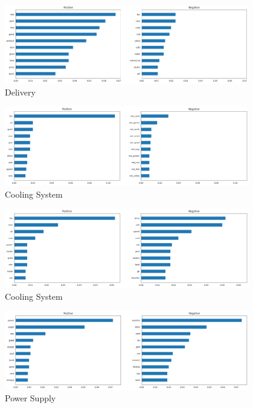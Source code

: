 \begin{figure}[p]
  \centering
  \includegraphics[width=0.95\textwidth]{images/experiments/T2-Delivery.png}
  \caption{Delivery}
  \label{fig:T2-Delivery}
\end{figure}

\begin{figure}[p]
  \centering
  \includegraphics[width=0.95\textwidth]{images/experiments/T3-CoolingSystem.png}
  \caption{Cooling System}
  \label{fig:T3-CoolingSystem}
\end{figure}

\begin{figure}[p]
  \centering
  \includegraphics[width=0.95\textwidth]{images/experiments/T4-CoolingSystem.png}
  \caption{Cooling System}
  \label{fig:T4-CoolingSystem}
\end{figure}

\begin{figure}[p]
  \centering
  \includegraphics[width=0.95\textwidth]{images/experiments/T8-PSU.png}
  \caption{Power Supply}
  \label{fig:T8-PowerSupply}
\end{figure}

